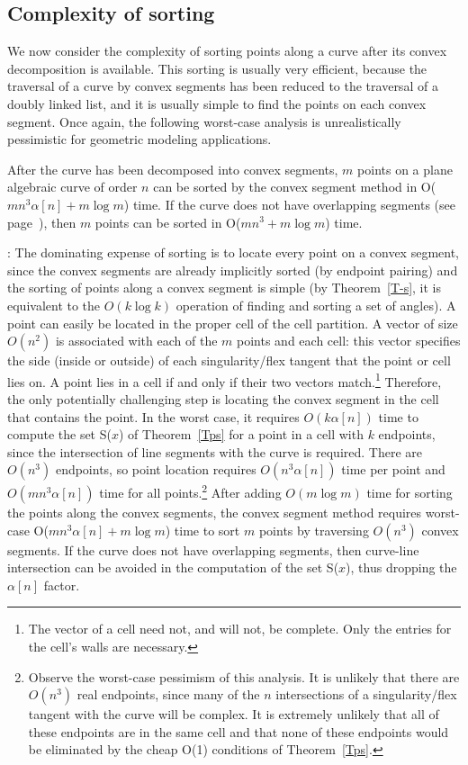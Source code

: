 \subsection{Complexity of sorting}

We now consider the complexity of sorting points along a curve after its convex
decomposition is available.
This sorting is usually very efficient, because the traversal of a curve by
convex segments has been reduced to the traversal of a doubly linked list, and
it is usually simple to find the points on each convex segment.
Once again, the following worst-case analysis is unrealistically pessimistic
for geometric modeling applications.

\begin{theorem}
After the curve has been decomposed into convex segments,
$m$ points on a plane algebraic curve of order $n$ can be sorted
by the convex segment method in O($m n^{3} \alpha[n] + m\log m$) time.
If the curve does not have overlapping segments (see page~\pageref{page-overlap}), then
$m$ points can be sorted in O($m n^{3} + m\log m$) time.
\end{theorem}
%
:
The dominating expense of sorting is to locate every point on a convex segment,
since the convex segments are already implicitly sorted (by endpoint pairing) and 
the sorting of points along a convex segment is simple
(by Theorem~\ref{T-s}, it is equivalent to the $O(k \log k)$ operation of finding
and sorting a set of angles). 
A point can easily be located in the proper cell of the cell partition.
A vector of size $O(n^{2})$ is associated with each of the $m$ points and each
cell: this vector specifies the side (inside or outside) of each singularity/flex tangent
that the point or cell lies on.
A point lies in a cell if and only if their two vectors match.\footnote{The vector
	of a cell need not, and will not, be complete.  Only the entries for the
	cell's walls are necessary.}
Therefore, the only potentially challenging step is locating the convex segment
in the cell that contains the point.
In the worst case, it requires $O(k \alpha[n])$ time to compute the set 
S($x$) of Theorem~\ref{Tps} for a point in a cell with $k$ endpoints, since
the intersection of line segments with the curve is required.
There are $O(n^{3})$ endpoints, so point location requires $O(n^{3}\alpha[n])$ time per
point and $O(mn^{3}\alpha[n])$ time for all points.\footnote{Observe the worst-case
	pessimism of this analysis.  It is unlikely that there are $O(n^{3})$
	real endpoints, since many of the $n$ intersections of a singularity/flex
	tangent with the curve will be complex.  It is extremely unlikely that all
	of these endpoints are in the same cell and that none of these endpoints
	would be eliminated by the cheap O(1) conditions of Theorem~\ref{Tps}.}
After adding $O(m \log m)$ time for sorting the points along the convex segments,
the convex segment method requires worst-case O($mn^{3}\alpha[n] + m \log m$) 
time to sort $m$ points by traversing $O(n^{3})$ convex segments.
If the curve does not have overlapping segments, then curve-line intersection can be
avoided in the computation of the set S($x$), thus dropping the $\alpha[n]$ factor.
\QED


